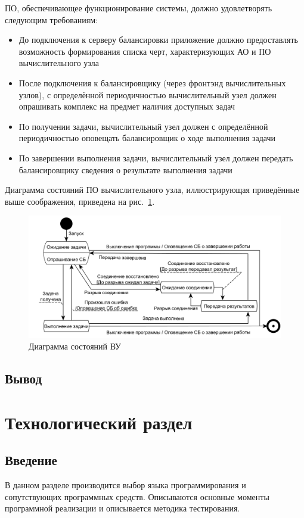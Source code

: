 \documentclass[a4paper,12pt]{report}
\numberwithin{equation}{section}
\begin{document}
ПО, обеспечивающее функционирование системы, должно удовлетворять следующим требованиям:
\begin{itemize}
  \item До подключения к серверу балансировки приложение должно предоставлять возможность формирования списка черт, характеризующих АО и ПО вычислительного узла
  \item После подключения к балансировщику (через фронтэнд вычислительных узлов), с определённой периодичностью вычислительный узел должен опрашивать комплекс на предмет наличия доступных задач
  \item По получении задачи, вычислительный узел должен с определённой периодичностью оповещать балансировщик о ходе выполнения задачи
  \item По завершении выполнения задачи, вычислительный узел должен передать балансировщику сведения о результате выполнения задачи
\end{itemize}

Диаграмма состояний ПО вычислительного узла, иллюстрирующая приведённые выше соображения, приведена на рис.~\ref{fig:node-state}.

\begin{figure}
  \centering
  \includegraphics[width=\linewidth]{diagrams/compnode/state}
  \caption{Диаграмма состояний ВУ}
  \label{fig:node-state}
\end{figure}

\subsection{Вывод}

\clearpage
\section{Технологический раздел}
\subsection{Введение}
В данном разделе производится выбор языка программирования и сопутствующих программных средств. 
Описываются основные моменты программной реализации и описывается методика тестирования.
\end{document}
